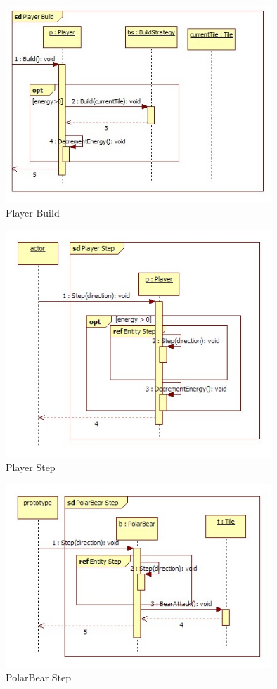 \begin{figure}[H]
        \begin{center}
                \includegraphics[width=10cm]{chapters/chapter07/seqdiag/Player_Build.jpg}
                \caption{Player Build}
                \label{Player Build}
        \end{center}
\end{figure}
\begin{figure}[H]
        \begin{center}
                \includegraphics[width=10cm]{chapters/chapter07/seqdiag/Player_Step.jpg}
                \caption{Player Step}
                \label{Player Step}
        \end{center}
\end{figure}
\begin{figure}[H]
        \begin{center}
                \includegraphics[width=10cm]{chapters/chapter07/seqdiag/PolarBear_Step.jpg}
                \caption{PolarBear Step}
                \label{PolarBear Step}
        \end{center}
\end{figure}
